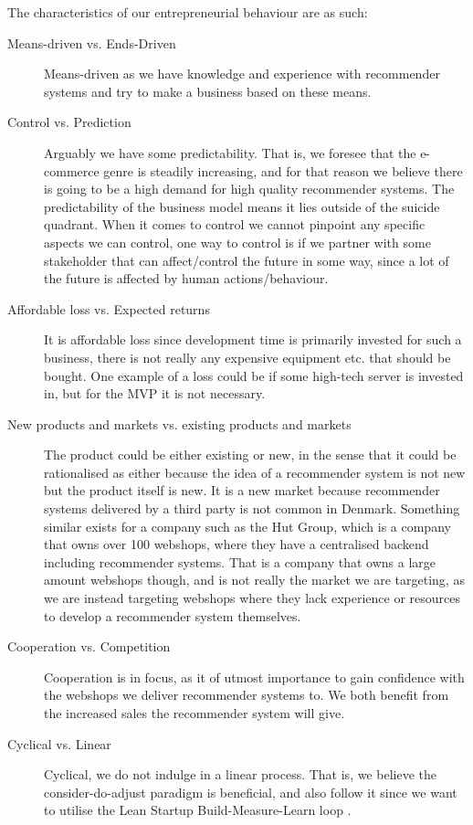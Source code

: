 The characteristics of our entrepreneurial behaviour are as such:
\begin{description}
	\item[Means-driven vs. Ends-Driven] Means-driven as we have knowledge and experience with recommender systems and try to make a business based on these means.
	\item[Control vs. Prediction] Arguably we have some predictability. That is, we foresee that the e-commerce genre is steadily increasing, and for that reason we believe there is going to be a high demand for high quality recommender systems. The predictability of the business model means it lies outside of the suicide quadrant.
	When it comes to control we cannot pinpoint any specific aspects we can control, one way to control is if we partner with some stakeholder that can affect/control the future in some way, since a lot of the future is affected by human actions/behaviour.
	\item[Affordable loss vs. Expected returns] It is affordable loss since development time is primarily invested for such a business, there is not really any expensive equipment etc. that should be bought. One example of a loss could be if some high-tech server is invested in, but for the MVP it is not necessary.
	\item[New products and markets vs. existing products and markets] The product could be either existing or new, in the sense that it could be rationalised as either because the idea of a recommender system is not new but the product itself is new. 
	It is a new market because recommender systems delivered by a third party is not common in Denmark. Something similar exists for a company such as the Hut Group, which is a company that owns over 100 webshops, where they have a centralised backend including recommender systems. That is a company that owns a large amount webshops though, and is not really the market we are targeting, as we are instead targeting webshops where they lack experience or resources to develop a recommender system themselves.
	\item[Cooperation vs. Competition] Cooperation is in focus, as it of utmost importance to gain confidence with the webshops we deliver recommender systems to. We both benefit from the increased sales the recommender system will give.
	\item[Cyclical vs. Linear] Cyclical, we do not indulge in a linear process. That is, we believe the consider-do-adjust paradigm is beneficial, and also follow it since we want to utilise the Lean Startup Build-Measure-Learn loop \citep[pg. 75]{ries2011lean}.
\end{description}



%

 